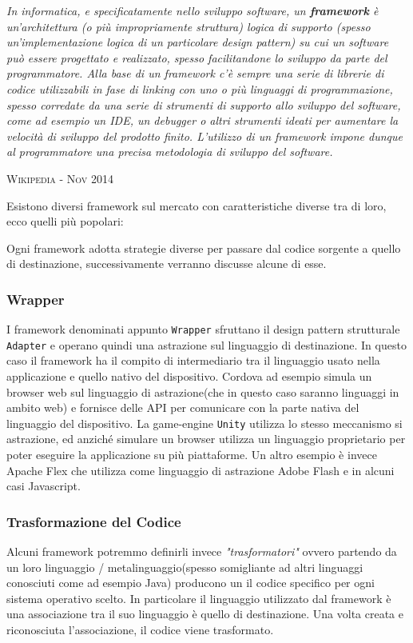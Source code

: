 \textit{In informatica, e specificatamente nello sviluppo software, un \textbf{framework} è un'architettura (o più impropriamente struttura) logica di supporto (spesso un'implementazione logica di un particolare design pattern) su cui un software può essere progettato e realizzato, spesso facilitandone lo sviluppo da parte del programmatore. Alla base di un framework c'è sempre una serie di librerie di codice utilizzabili in fase di linking con uno o più linguaggi di programmazione, spesso corredate da una serie di strumenti di supporto allo sviluppo del software, come ad esempio un IDE, un debugger o altri strumenti ideati per aumentare la velocità di sviluppo del prodotto finito. L'utilizzo di un framework impone dunque al programmatore una precisa metodologia di sviluppo del software.}

\textsc{Wikipedia - Nov 2014}

Esistono diversi framework sul mercato con caratteristiche diverse tra di loro, ecco quelli più popolari:


Ogni framework adotta strategie diverse per passare dal codice sorgente a quello di destinazione, successivamente verranno discusse alcune di esse.

\subsubsection{Wrapper}
I framework denominati appunto \texttt{Wrapper} sfruttano il design pattern strutturale \texttt{Adapter} e operano quindi una astrazione sul linguaggio di destinazione. In questo caso il framework ha il compito di intermediario tra il linguaggio usato nella applicazione e quello nativo del dispositivo.
Cordova ad esempio simula un browser web sul linguaggio di astrazione(che in questo caso saranno linguaggi in ambito web) e fornisce delle API per comunicare con la parte nativa del linguaggio del dispositivo.
La game-engine \texttt{Unity} utilizza lo stesso meccanismo si astrazione, ed anziché simulare un browser utilizza un linguaggio proprietario per poter eseguire la applicazione su più piattaforme.
Un altro esempio è invece Apache Flex che utilizza come linguaggio di astrazione Adobe Flash e in alcuni casi Javascript.
\subsubsection{Trasformazione del Codice}
Alcuni framework potremmo definirli invece \emph{"trasformatori"} ovvero partendo da un loro linguaggio / metalinguaggio(spesso somigliante ad altri linguaggi conosciuti come ad esempio Java) producono un il codice specifico per ogni sistema operativo scelto.
In particolare il linguaggio utilizzato dal framework è una associazione tra il suo linguaggio è quello di destinazione. Una volta creata e riconosciuta l'associazione, il codice viene trasformato.
